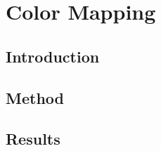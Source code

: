 
\chapter{Color Mapping} %
\label{cha:color_mapping}


\section{Introduction}


\section{Method}


\section{Results}



